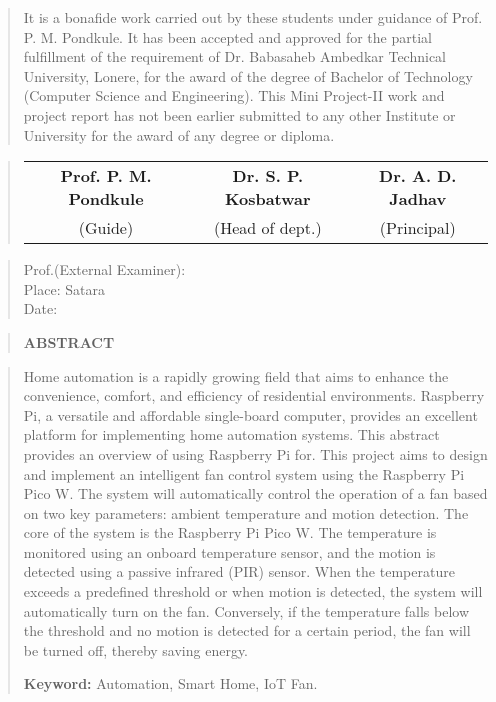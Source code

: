 \documentclass[12pt]{report}
\begin{document}
	\vspace{0.7cm}
	\begin{quote}
		\normalsize
		It is a bonafide work carried out by these students under guidance of
		Prof. P. M. Pondkule. It has been accepted and approved for the partial
		fulfillment of the requirement of Dr. Babasaheb Ambedkar Technical
		University, Lonere, for the award of the degree of Bachelor of
		Technology (Computer Science and Engineering). This Mini Project-II work and project
		report has not been earlier submitted to any other Institute or University for the
		award of any degree or diploma.
	\end{quote}
	
	\begin{quote}
		\normalsize
		\centering
		\vspace{3cm}
		\begin{table}[ht]
			\centering
			\begin{tabular}{c   c   c}
				\bfseries
				Prof. P. M. Pondkule & \bfseries Dr. S. P. Kosbatwar & \bfseries Dr. A. D. Jadhav \\[2ex]
				(Guide) & (Head of dept.) & (Principal)\\[2ex]
			\end{tabular}
		\end{table}
	\end{quote}
	\vspace{2cm}
	\begin{quote}
		Prof.(External Examiner):\\Place: Satara\\Date:
	\end{quote}
	\newpage
	
	
	\begin{quote}
		\centering
		\LARGE
		\textbf{ABSTRACT}
	\end{quote}
	
	
	\begin{quote}
		\hspace{1cm}Home automation is a rapidly growing field that aims to enhance the convenience, comfort, and efficiency of residential environments. Raspberry Pi, a versatile and affordable single-board computer, provides an excellent platform for implementing home automation systems. This abstract provides an overview of using Raspberry Pi for.  This project aims to design and implement an intelligent fan control system using the Raspberry Pi Pico W. The system will automatically control the operation of a fan based on two key parameters: ambient temperature and motion detection. The core of the system is the Raspberry Pi Pico W. The temperature is monitored using an onboard temperature sensor, and the motion is detected using a passive infrared (PIR) sensor. When the temperature exceeds a predefined threshold or when motion is detected, the system will automatically turn on the fan. Conversely, if the temperature falls below the threshold and no motion is detected for a certain period, the fan will be turned off, thereby saving energy.
		
		\textbf{Keyword:} Automation, Smart Home, IoT Fan.
	\end{quote}
	\clearpage
	
\end{document}
